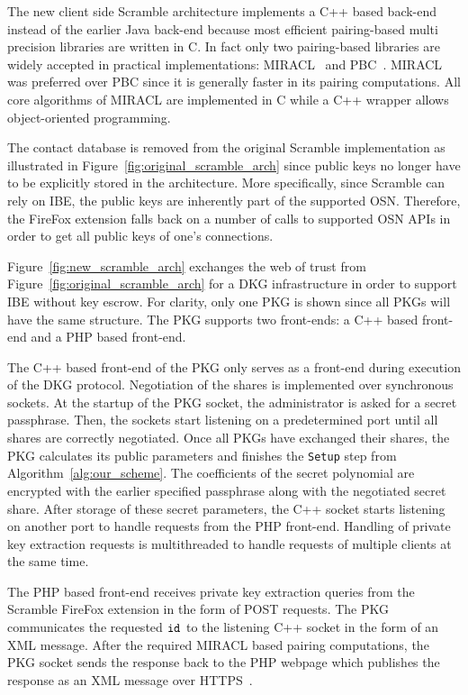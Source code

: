 The new client side Scramble architecture implements a C++ based back-end instead of the earlier Java back-end because most efficient pairing-based multi precision libraries are written in C. In fact only two pairing-based libraries are widely accepted in practical implementations: MIRACL~\cite{art:Scott03} and PBC~\cite{thesis:Lynn07}. MIRACL was preferred over PBC since it is generally faster in its pairing computations. All core algorithms of MIRACL are implemented in C while a C++ wrapper allows object-oriented programming.

The contact database is removed from the original Scramble implementation as illustrated in Figure~\ref{fig:original_scramble_arch} since public keys no longer have to be explicitly stored in the architecture. More specifically, since Scramble can rely on IBE, the public keys are inherently part of the supported OSN. Therefore, the FireFox extension falls back on a number of calls to supported OSN APIs in order to get all public keys of one's connections.

Figure~\ref{fig:new_scramble_arch} exchanges the web of trust from Figure~\ref{fig:original_scramble_arch} for a DKG infrastructure in order to support IBE without key escrow. For clarity, only one PKG is shown since all PKGs will have the same structure. The PKG supports two front-ends: a C++ based front-end and a PHP based front-end. 

The C++ based front-end of the PKG only serves as a front-end during execution of the DKG protocol. Negotiation of the shares is implemented over synchronous sockets. At the startup of the PKG socket, the administrator is asked for a secret passphrase. Then, the sockets start listening on a predetermined port until all shares are correctly negotiated. Once all PKGs have exchanged their shares, the PKG calculates its public parameters and finishes the \texttt{Setup} step from Algorithm~\ref{alg:our_scheme}. The coefficients of the secret polynomial are encrypted with the earlier specified passphrase along with the negotiated secret share. After storage of these secret parameters, the C++ socket starts listening on another port to handle requests from the PHP front-end. Handling of private key extraction requests is multithreaded to handle requests of multiple clients at the same time.

The PHP based front-end receives private key extraction queries from the Scramble FireFox extension in the form of POST requests. The PKG communicates the requested $\mathtt{id}_{}$ to the listening C++ socket in the form of an XML message. After the required MIRACL based pairing computations, the PKG socket sends the response back to the PHP webpage which publishes the response as an XML message over HTTPS~\cite{rfc2818}.

